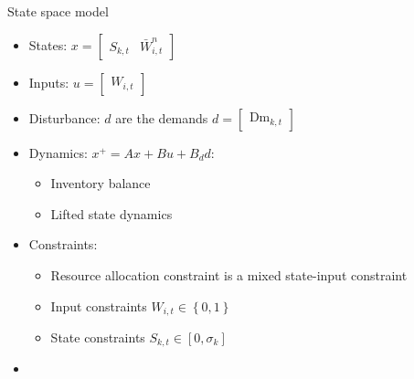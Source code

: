 \documentclass[table]{beamer}
\newcommand{\set}[1]{\left\lbrace #1 \right\rbrace}
\newcommand{\Dem}{\textrm{Dm}}
\begin{document}
{
\begin{frame}{State space model}
\begin{itemize}
\item \alert{States}: $ x = \begin{bmatrix} S_{k,t} &
    \bar{W}_{i,t}^n \end{bmatrix}$
 \item \alert{Inputs}: $u = \begin{bmatrix} W_{i,t} \end{bmatrix}$
\item \alert{Disturbance}: $d$ are the demands $d = \begin{bmatrix}
    \Dem_{k,t} \end{bmatrix}$
\item \alert{Dynamics}: $x^+ = Ax + Bu + B_dd$:
  \begin{itemize}
    \item Inventory balance
    \item Lifted state dynamics
  \end{itemize}
\item \alert{Constraints}:
  \begin{itemize}
    \item  Resource allocation constraint is a mixed state-input
      constraint
     \item Input constraints $W_{i,t} \in \set{0,1}$
     \item State constraints $S_{k,t} \in [0,\sigma_k]$
   \end{itemize}
\item {\color{blue}{Can be generalized to model variable batch size,
    changeovers, etc.}}
\end{itemize}
\end{frame}
}
\end{document}
